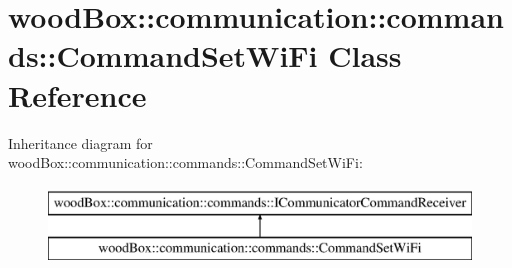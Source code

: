 \hypertarget{classwood_box_1_1communication_1_1commands_1_1_command_set_wi_fi}{}\section{wood\+Box\+:\+:communication\+:\+:commands\+:\+:Command\+Set\+Wi\+Fi Class Reference}
\label{classwood_box_1_1communication_1_1commands_1_1_command_set_wi_fi}
Inheritance diagram for wood\+Box\+:\+:communication\+:\+:commands\+:\+:Command\+Set\+Wi\+Fi\+:\begin{figure}[H]
\begin{center}
\leavevmode
\includegraphics[height=2.000000cm]{classwood_box_1_1communication_1_1commands_1_1_command_set_wi_fi}
\end{center}
\end{figure}
